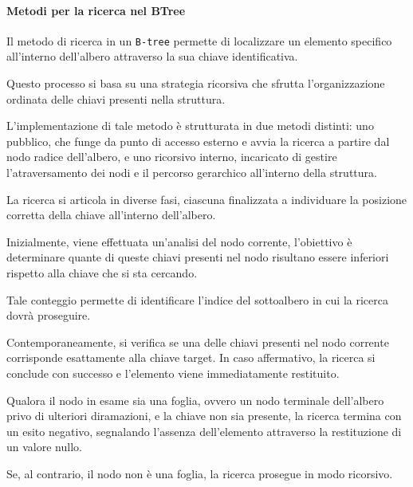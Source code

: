 \documentclass[12pt,a4paper,openright,twoside]{book}
\begin{document}
                    

                \pagebreak

                \paragraph{Metodi per la ricerca nel BTree}

                    Il metodo di ricerca in un \texttt{B-tree} permette di localizzare un elemento specifico all'interno dell'albero attraverso la sua chiave identificativa.

                    Questo processo si basa su una strategia ricorsiva che sfrutta l'organizzazione ordinata delle chiavi presenti nella struttura.

                    L'implementazione di tale metodo è strutturata in due metodi distinti: uno pubblico, che funge da punto di accesso esterno e avvia la ricerca a partire dal nodo radice dell'albero, e uno ricorsivo interno, incaricato di gestire l'atraversamento dei nodi e il percorso gerarchico all'interno della struttura.

                    La ricerca si articola in diverse fasi, ciascuna finalizzata a individuare la posizione corretta della chiave all'interno dell'albero.

                    Inizialmente, viene effettuata un'analisi del nodo corrente, l'obiettivo è determinare quante di queste chiavi presenti nel nodo risultano essere inferiori rispetto alla chiave che si sta cercando.

                    Tale conteggio permette di identificare l'indice del sottoalbero in cui la ricerca dovrà proseguire.

                    Contemporaneamente, si verifica se una delle chiavi presenti nel nodo corrente corrisponde esattamente alla chiave target. In caso affermativo, la ricerca si conclude con successo e l'elemento viene immediatamente restituito.

                    Qualora il nodo in esame sia una foglia, ovvero un nodo terminale dell'albero privo di ulteriori diramazioni, e la chiave non sia presente, la ricerca termina con un esito negativo, segnalando l'assenza dell'elemento attraverso la restituzione di un valore nullo.

                    Se, al contrario, il nodo non è una foglia, la ricerca prosegue in modo ricorsivo.
\end{document}
